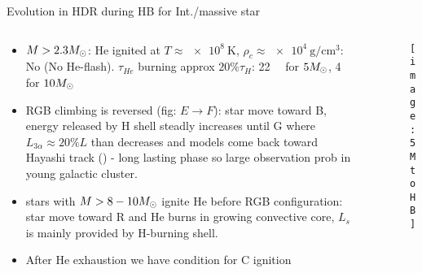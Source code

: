 \begin{frame}{Evolution in HDR during HB for Int./massive star}
\begin{columns}[T]
	\begin{column}{0.55\textwidth}
	\begin{itemize}
	\item $M>2.3M_{\odot}$: He ignited at $T\approx\SI{e8}{\kelvin}$, $\rho_c\approx\SI{e4}{\gram\per\cubic\cm}$: No \Pelectron (No He-flash). $\tau_{He}$ burning approx $20\%\tau_H$: \SI{22}{\mega\year} for $5M_{\odot}$, \SI{4}{\mega\year} for $10M_{\odot}$
	\item RGB climbing is reversed (fig: $E\to F$): star move toward B, energy released by H shell steadly increases until G where $L_{3\alpha}\approx20\%L$ than decreases and models come back toward Hayashi track () - long lasting phase so large observation prob in young galactic cluster.
	\item stars with $M>8-10M_{\odot}$ ignite He before RGB configuration: star move toward R and He burns in growing convective core, $L_s$ is mainly provided by H-burning shell.
	\item After He exhaustion we have condition for C ignition
	\end{itemize}
	\end{column}
	\begin{column}{0.45\textwidth}
	\begin{figure}[!ht]
	\texttt{[image: 5MtoHB]}\label{fig:5MtoHB}
	\end{figure}
\end{column}\end{columns}
\end{frame}

